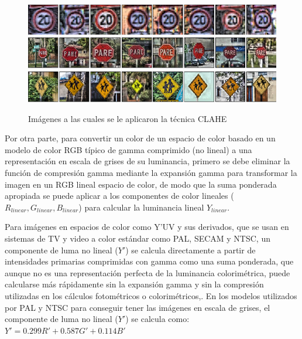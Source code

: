 			\begin{figure}[H]
			\includegraphics[width=1\textwidth]{images/desarrollo/Normalization_Processing/norm_test1}
			\includegraphics[width=1\textwidth]{images/desarrollo/Normalization_Processing/norm_test3}
			\includegraphics[width=1\textwidth]{images/desarrollo/Normalization_Processing/norm_test4}
			\begin{center}
			\caption{\small{Imágenes a las cuales se le aplicaron la técnica CLAHE }}
			
			{\small{\fontsize{10}{16.8}\selectfont {Fuente: Elaboración propia}}}
			\end{center}
			\vspace{-1.5em}
			\end{figure}
		
		Por otra parte, para convertir un color de un espacio de color basado en un modelo de color RGB típico de gamma comprimido (no lineal) a una representación en escala de grises de su luminancia, primero se debe eliminar la función de compresión gamma mediante la expansión gamma para transformar la imagen en un RGB lineal espacio de color, de modo que la suma ponderada apropiada se puede aplicar a los componentes de color lineales ($R_{linear} , G_{linear} , B_{linear}$) para calcular la luminancia lineal $Y_{linear}$.

		Para imágenes en espacios de color como Y'UV y sus derivados, que se usan en sistemas de TV y video a color estándar como PAL, SECAM y NTSC, un componente de luma no lineal ($Y'$) se calcula directamente a partir de intensidades primarias comprimidas con gamma como una suma ponderada, que aunque no es una representación perfecta de la luminancia colorimétrica, puede calcularse más rápidamente sin la expansión gamma y sin la compresión utilizadas en los cálculos fotométricos o colorimétricos,\citep{POYNTON2003257}. En los modelos utilizados por PAL y NTSC para conseguir tener las imágenes en escala de grises, el componente de luma no lineal ($Y'$) se calcula como: \begingroup\makeatletter\def\f@size{14.8}\check@mathfonts	$Y' = 0.299R' + 0.587G' +0.114B'$ \endgroup \citep{CookJ}

